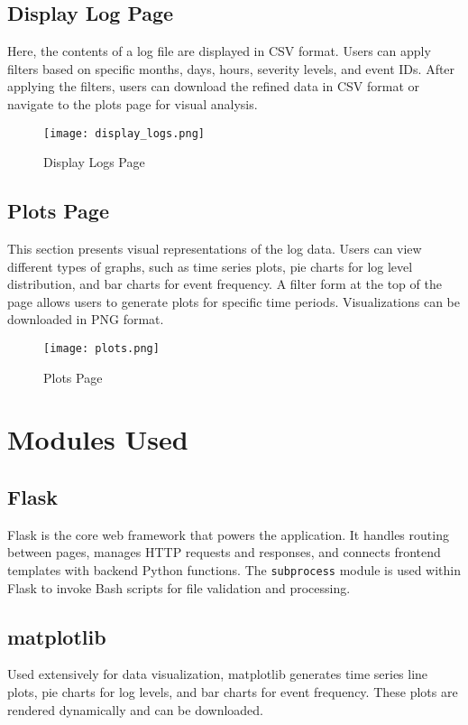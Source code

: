 \documentclass{article}
\begin{document}
\subsection{Display Log Page}
Here, the contents of a log file are displayed in CSV format. Users can apply filters based on specific months, days, hours, severity levels, and event IDs. After applying the filters, users can download the refined data in CSV format or navigate to the plots page for visual analysis.
\begin{figure}[h]
    \centering
    \texttt{[image: display\_logs.png]}
    \caption{Display Logs Page}
\end{figure}

\subsection{Plots Page}
This section presents visual representations of the log data. Users can view different types of graphs, such as time series plots, pie charts for log level distribution, and bar charts for event frequency. A filter form at the top of the page allows users to generate plots for specific time periods. Visualizations can be downloaded in PNG format.
\begin{figure}[h]
    \centering
    \texttt{[image: plots.png]}
    \caption{Plots Page}
\end{figure}

\section{Modules Used}
\subsection{Flask}
Flask is the core web framework that powers the application. It handles routing between pages, manages HTTP requests and responses, and connects frontend templates with backend Python functions. The \texttt{subprocess} module is used within Flask to invoke Bash scripts for file validation and processing.

\subsection{matplotlib}
Used extensively for data visualization, matplotlib generates time series line plots, pie charts for log levels, and bar charts for event frequency. These plots are rendered dynamically and can be downloaded.
\end{document}

